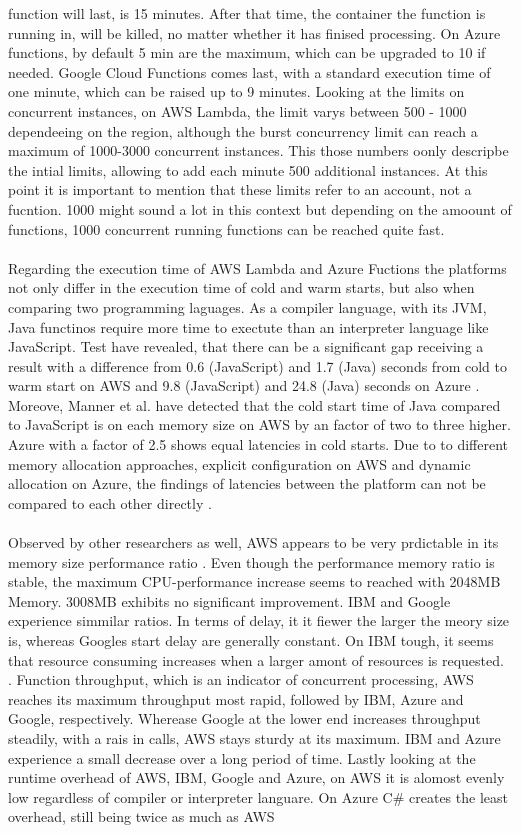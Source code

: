 \documentclass[11pt]{article}
\begin{document}
function will last, is 15 minutes. After that time, the container the function is running in, will be killed, no matter whether it has finised processing. On Azure functions, by default 5 min are the maximum, which can be upgraded to 10 if needed. Google Cloud Functions comes last, with a standard execution time of one minute, which can be raised up to 9 minutes. Looking at the limits on concurrent instances, on AWS Lambda, the limit varys between 500 - 1000 dependeeing on the region, although the burst concurrency limit can reach a maximum of 1000-3000 concurrent instances. This those numbers oonly descripbe the intial limits, allowing to add each minute 500 additional instances. At this point it is important to mention that these limits refer to an account, not a fucntion. 1000 might sound a lot in this context but depending on the amoount of functions, 1000 concurrent running functions can be reached quite fast.\\\\ Regarding the execution time of AWS Lambda and Azure Fuctions the platforms not only differ in the execution time of cold and warm starts, but also when comparing two programming laguages. As a compiler language, with its JVM, Java functinos require more time to exectute than an interpreter language like JavaScript. Test have revealed, that there can be a significant gap receiving a result with a difference from 0.6 (JavaScript) and 1.7 (Java) seconds from cold to warm start on AWS and 9.8 (JavaScript) and 24.8 (Java) seconds on Azure \cite{manner2018cold}. Moreove, Manner et al. have detected that the cold start time of Java compared to JavaScript is on each memory size on AWS by an factor of two to three higher. Azure with a factor of 2.5 shows equal latencies in cold starts. Due to to different memory allocation approaches, explicit configuration on AWS and dynamic allocation on Azure, the findings of latencies between the platform can not be compared to each other directly \cite{manner2018cold}.\\\\ Observed by other researchers as well, AWS appears to be very prdictable in its memory size performance ratio \cite{pawlik2019performance}. Even though the performance memory ratio is stable, the maximum CPU-performance increase seems to reached with 2048MB Memory. 3008MB exhibits no significant improvement. IBM and Google experience simmilar ratios. In terms of delay, it it fiewer the larger the meory size is, whereas Googles start delay are generally constant. On IBM tough, it seems that resource consuming increases when a larger amont of resources is requested. \cite{pawlik2019performance}. Function throughput, which is an indicator of concurrent processing, AWS reaches its maximum throughput most rapid, followed by IBM, Azure and Google, respectively. Wherease Google at the lower end increases throughput steadily, with a rais in calls, AWS stays sturdy at its maximum. IBM and Azure experience a small decrease over a long period of time. Lastly looking at the runtime overhead of AWS, IBM, Google and Azure, on AWS it is alomost evenly low regardless of compiler or interpreter languare. On Azure C\# creates the least overhead, still being twice as much as AWS 
\end{document}
